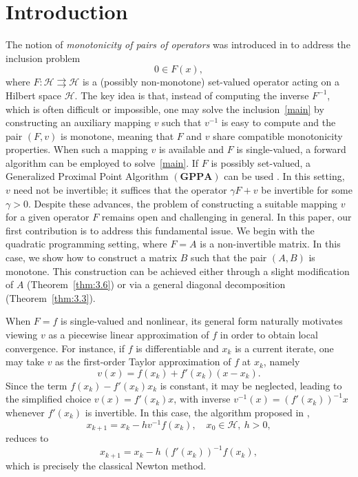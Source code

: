 \documentclass[11pt]{article}
\theoremstyle{definition}
\theoremstyle{definition}
\theoremstyle{definition}
\begin{document}
\section{Introduction}
{
The notion of \emph{monotonicity of pairs of operators} was introduced in \cite{acl} to address the inclusion problem
\begin{equation}\label{main}
0 \in F(x),
\end{equation}
where \(F:\mathcal{H} \rightrightarrows \mathcal{H}\) is a (possibly non-monotone) set-valued operator acting on a Hilbert space \(\mathcal{H}\).
The key idea is that, instead of computing the inverse \(F^{-1}\), which is often difficult or impossible, one may solve the inclusion~\eqref{main} by constructing an auxiliary mapping \(v\) such that \(v^{-1}\) is easy to compute and the pair \((F,v)\) is monotone, meaning that \(F\) and \(v\) share compatible monotonicity properties.
When such a mapping \(v\) is available and \(F\) is single-valued, a forward algorithm \cite{acl} can be employed to solve~\eqref{main}. If \(F\) is possibly set-valued, a Generalized Proximal Point Algorithm \((\mathbf{GPPA})\) can be used \cite{LDT}. In this setting, \(v\) need not be invertible; it suffices that the operator \(\gamma F + v\) be invertible for some \(\gamma>0\). Despite these advances, the problem of constructing a suitable mapping \(v\) for a given operator \(F\) remains open and challenging in general.
In this paper, our first contribution is to address this fundamental issue. We begin with the quadratic programming setting, where \(F=A\) is a non-invertible matrix. In this case, we show how to construct a matrix \(B\) such that the pair \((A,B)\) is monotone. This construction can be achieved either through a slight modification of \(A\) (Theorem~\ref{thm:3.6}) or via a general diagonal decomposition (Theorem~\ref{thm:3.3}).
}

{When \(F=f\) is single-valued and nonlinear, its general form naturally motivates viewing \(v\) as a piecewise linear approximation of \(f\) in order to obtain local convergence. For instance, if \(f\) is differentiable and \(x_k\) is a current iterate, one may take \(v\) as the first-order Taylor approximation of \(f\) at \(x_k\), namely
\[
v(x)=f(x_k)+f'(x_k)(x-x_k).
\]
Since the term \(f(x_k)-f'(x_k)x_k\) is constant, it may be neglected, leading to the simplified choice \(v(x)=f'(x_k)x\), with inverse \(v^{-1}(x)=(f'(x_k))^{-1}x\) whenever \(f'(x_k)\) is invertible. In this case, the algorithm proposed in \cite{acl},
\begin{equation}\label{algonew}
x_{k+1}=x_k-hv^{-1}f(x_k), \quad x_0\in\mathcal{H}, \ h>0,
\end{equation}
reduces to
\[
x_{k+1}=x_k-h\,(f'(x_k))^{-1}f(x_k),
\]
which is precisely the classical Newton method.
}
\end{document}
